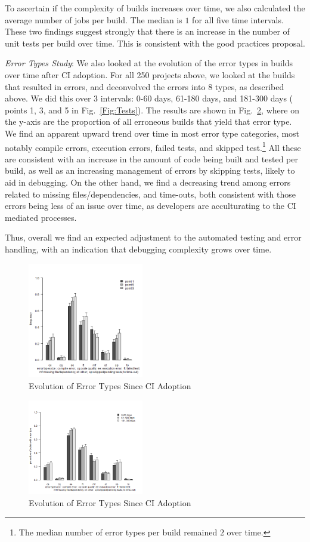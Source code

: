 To ascertain if the complexity of builds increases over time, we also calculated 
the average number of jobs per build.
The median is $1$ for all five time intervals.
These two findings suggest strongly that there is an increase in the number of 
unit tests per build over time.
This is consistent with the good practices proposal.


\smallskip\noindent \emph{Error Types Study}:
We also looked at the evolution of the error types in builds over time after CI 
adoption.
For all 250 projects above, we looked at the builds that resulted in errors, 
and deconvolved the errors into 8 types, as described above.
We did this over 3 intervals: 0-60 days, 61-180 days, and 181-300 days (\ie 
points 1, 3, and  5 in Fig.~\ref{Fig:Tests}).
The results are shown in Fig.~\ref{Fig:BugTypes}, where on the y-axis are 
the proportion of all erroneous builds that yield that error type.
We find an apparent upward trend over time in most error type categories, 
most notably compile errors, execution errors, failed tests, and skipped 
test.\footnote{The median number of error types per build remained $2$ over 
time.}
All these are consistent with an increase in the amount of code being built 
and tested per build, as well as an increasing management of errors by 
skipping tests, likely to aid in debugging.
On the other hand, we find a decreasing trend among errors related to missing 
files/dependencies, and time-outs, both consistent with those errors being less 
of an issue over time, as developers are acculturating to the CI mediated 
processes.

Thus, overall we find an expected adjustment to the automated testing and 
error handling, with an indication that debugging complexity grows over time.

\begin{figure}[!t]
\centering
\includegraphics[width=0.45\textwidth, clip=true, trim=0 15 15 50]{plot_together.png}
\caption{Evolution of Error Types Since CI Adoption}
\label{Fig:BugTypesold}
\end{figure}


\begin{figure}[!t]
	\centering
	\includegraphics[width=0.45\textwidth, clip=true, trim=0 15 15 50]{new_plot_together.png}
	\caption{Evolution of Error Types Since CI Adoption}
	\label{Fig:BugTypes}
\end{figure}

